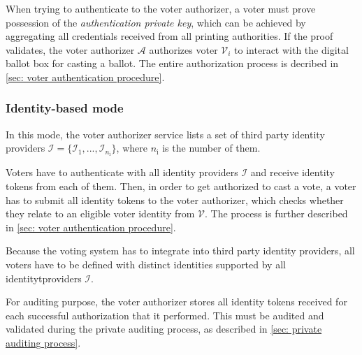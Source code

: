 When trying to authenticate to the voter authorizer, a voter must prove possession of the \textit{authentication private key}, which can be achieved by aggregating all credentials received from all printing authorities. If the proof validates, the voter authorizer $\mathcal{A}$ authorizes voter $\mathcal{V}_i$ to interact with the digital ballot box for casting a ballot. The entire authorization process is decribed in \cref{sec: voter authentication procedure}.


\subsubsection{Identity-based mode} \label{sec: identity-based mode}
In this mode, the voter authorizer service lists a set of third party identity providers $\boldsymbol{\mathcal{I}} = \{ \mathcal{I}_1, ..., \mathcal{I}_{n_\mathrm{i}} \}$, where $n_\mathrm{i}$ is the number of them.

Voters have to authenticate with all identity providers $\boldsymbol{\mathcal{I}}$ and receive identity tokens from each of them. Then, in order to get authorized to cast a vote, a voter has to submit all identity tokens to the voter authorizer, which checks whether they relate to an eligible voter identity from $\boldsymbol{\mathcal{V}}$. The process is further described in \cref{sec: voter authentication procedure}.

Because the voting system has to integrate into third party identity providers, all voters have to be defined with distinct identities supported by all identitytproviders $\boldsymbol{\mathcal{I}}$.

For auditing purpose, the voter authorizer stores all identity tokens received for each successful authorization that it performed. This must be audited and validated during the private auditing process, as described in \cref{sec: private auditing process}.
